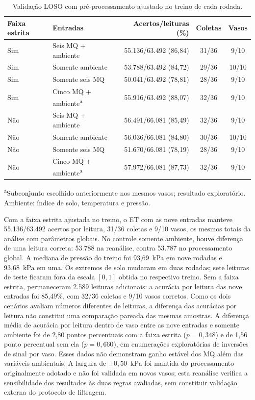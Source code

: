 \begin{table}[htbp]
    \centering
    \scriptsize
    \caption{Validação LOSO com pré-processamento ajustado no treino de cada rodada.}
    \label{tab:preprocessamento_loso_treino}
    \begin{tabular}{llrcc}
        \hline
        Faixa estrita & Entradas & Acertos/leituras (\%) & Coletas & Vasos \\
        \hline
        Sim & Seis MQ + ambiente & 55.136/63.492 (86,84) & 31/36 & 9/10 \\
        Sim & Somente ambiente & 53.788/63.492 (84,72) & 29/36 & 10/10 \\
        Sim & Somente seis MQ & 50.041/63.492 (78,81) & 28/36 & 9/10 \\
        Sim & Cinco MQ + ambiente\textsuperscript{a} & 55.916/63.492 (88,07) & 32/36 & 9/10 \\
        Não & Seis MQ + ambiente & 56.491/66.081 (85,49) & 32/36 & 9/10 \\
        Não & Somente ambiente & 56.036/66.081 (84,80) & 30/36 & 10/10 \\
        Não & Somente seis MQ & 51.670/66.081 (78,19) & 28/36 & 9/10 \\
        Não & Cinco MQ + ambiente\textsuperscript{a} & 57.972/66.081 (87,73) & 32/36 & 9/10 \\
        \hline
    \end{tabular}

    \vspace{0.1cm}
    {\footnotesize \textsuperscript{a}Subconjunto escolhido anteriormente
    nos mesmos vasos; resultado exploratório. Ambiente: índice de solo,
    temperatura e pressão.}
\end{table}

Com a faixa estrita ajustada no treino, o ET com as nove entradas manteve
55.136/63.492 acertos por leitura, 31/36 coletas e 9/10 vasos, os mesmos
totais da análise com parâmetros globais. No controle somente ambiente,
houve diferença de uma leitura correta: 53.788 na reanálise, contra
53.787 no processamento global. A mediana de pressão do treino
foi 93,69~kPa em nove rodadas e 93,68~kPa em uma. Os extremos de solo
mudaram em duas rodadas; sete leituras de teste ficaram fora da escala
$[0,1]$ obtida no respectivo treino. Sem a faixa estrita, permaneceram
2.589 leituras adicionais: a acurácia por leitura das nove entradas foi
85,49\%, com 32/36 coletas e 9/10 vasos corretos. Como os dois cenários
avaliam números diferentes de leituras, a diferença das acurácias por
leitura não constitui uma comparação pareada das mesmas amostras. A
diferença média de acurácia por leitura dentro de vaso entre as nove
entradas e somente ambiente foi de 2,80 pontos percentuais com a faixa
estrita ($p=0{,}348$) e de 1,56 ponto percentual sem ela ($p=0{,}660$),
em enumerações exploratórias de inversões de sinal por vaso. Esses dados
não demonstram ganho estável dos MQ além das variáveis ambientais. A
largura de $\pm 0{,}50$~kPa foi mantida do processamento originalmente
adotado e não foi validada em novos vasos; esta reanálise verifica a
sensibilidade dos resultados às duas regras avaliadas, sem constituir
validação externa do protocolo de filtragem.

